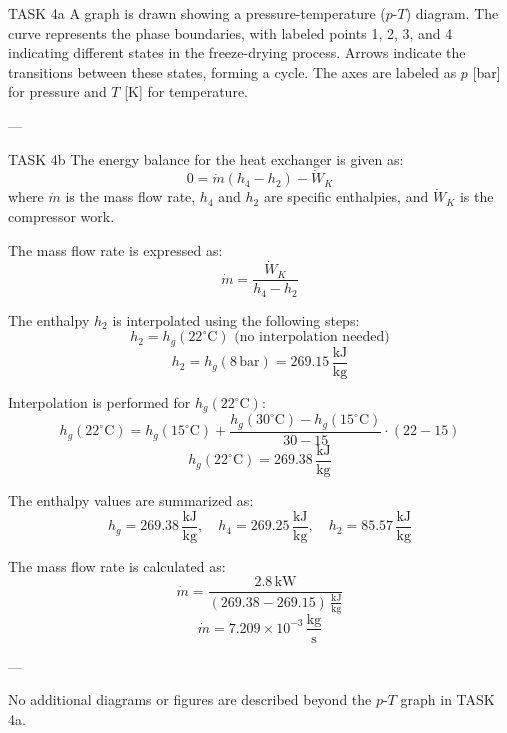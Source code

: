 TASK 4a  
A graph is drawn showing a pressure-temperature (\( p \)-\( T \)) diagram. The curve represents the phase boundaries, with labeled points 1, 2, 3, and 4 indicating different states in the freeze-drying process. Arrows indicate the transitions between these states, forming a cycle. The axes are labeled as \( p \) [bar] for pressure and \( T \) [K] for temperature.

---

TASK 4b  
The energy balance for the heat exchanger is given as:  
\[
0 = \dot{m} \left( h_4 - h_2 \right) - \dot{W}_K
\]  
where \( \dot{m} \) is the mass flow rate, \( h_4 \) and \( h_2 \) are specific enthalpies, and \( \dot{W}_K \) is the compressor work.

The mass flow rate is expressed as:  
\[
\dot{m} = \frac{\dot{W}_K}{h_4 - h_2}
\]

The enthalpy \( h_2 \) is interpolated using the following steps:  
\[
h_2 = h_g(22^\circ \text{C}) \text{ (no interpolation needed)}
\]  
\[
h_2 = h_g(8 \, \text{bar}) = 269.15 \, \frac{\text{kJ}}{\text{kg}}
\]

Interpolation is performed for \( h_g(22^\circ \text{C}) \):  
\[
h_g(22^\circ \text{C}) = h_g(15^\circ \text{C}) + \frac{h_g(30^\circ \text{C}) - h_g(15^\circ \text{C})}{30 - 15} \cdot (22 - 15)
\]  
\[
h_g(22^\circ \text{C}) = 269.38 \, \frac{\text{kJ}}{\text{kg}}
\]

The enthalpy values are summarized as:  
\[
h_g = 269.38 \, \frac{\text{kJ}}{\text{kg}}, \quad h_4 = 269.25 \, \frac{\text{kJ}}{\text{kg}}, \quad h_2 = 85.57 \, \frac{\text{kJ}}{\text{kg}}
\]

The mass flow rate is calculated as:  
\[
\dot{m} = \frac{2.8 \, \text{kW}}{(269.38 - 269.15) \, \frac{\text{kJ}}{\text{kg}}}
\]  
\[
\dot{m} = 7.209 \times 10^{-3} \, \frac{\text{kg}}{\text{s}}
\]  

---

No additional diagrams or figures are described beyond the \( p \)-\( T \) graph in TASK 4a.